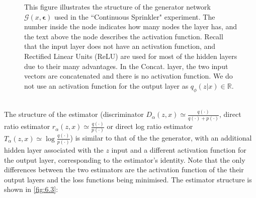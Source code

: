 \documentclass[honours,12pt]{unswthesis}
\newcommand{\R}{\mathbb{R}}
\numberwithin{equation}{section}
\theoremstyle{definition}
\begin{document}
\begin{figure}[h!]
\caption{\small This figure illustrates the structure of the generator network $\mathcal{G}(x,\bm{\epsilon})$ used in the ``Continuous Sprinkler" experiment. The number inside the node indicates how many nodes the layer has, and the text above the node describes the activation function. Recall that the input layer does not have an activation function, and Rectified Linear Units (ReLU) are used for most of the hidden layers due to their many advantages. In the Concat. layer, the two input vectors are concatenated and there is no activation function. We do not use an activation function for the output layer as $q_\phi(z|x)\in \R$.}
\label{fig:6.2}
\end{figure}\\
The structure of the estimator (discriminator $D_\alpha(z,x)\simeq \frac{q(\cdot)}{q(\cdot)+p(\cdot)}$, direct ratio estimator $r_\alpha(z,x)\simeq \frac{q(\cdot)}{p(\cdot)}$ or direct log ratio estimator $T_\alpha(z,x)\simeq \log \frac{q(\cdot)}{p(\cdot)}$) is similar to that of the the generator, with an additional hidden layer associated with the $z$ input and a different activation function for the output layer, corresponding to the estimator's identity. Note that the only differences between the two estimators are the activation function of the their output layers and the loss functions being minimised. The estimator structure is shown in \autoref{fig:6.3}:
\end{document}
